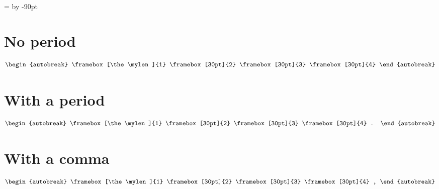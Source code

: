 \documentclass{article}
\begin{document}
\newdimen\mylen
\mylen=\linewidth
\advance\mylen by -90pt

\def\len{\the\mylen}

\section{No period}

\begin{align}
  \begin{autobreak}
    \framebox[\len]{1}
    \framebox[30pt]{2}
    \framebox[30pt]{3}
    \framebox[30pt]{4}
  \end{autobreak}
\end{align}

\section{With a period}

\begin{align}
  \begin{autobreak}
    \framebox[\len]{1}
    \framebox[30pt]{2}
    \framebox[30pt]{3}
    \framebox[30pt]{4}
    .
  \end{autobreak}
\end{align}

\section{With a comma}

\begin{align}
  \begin{autobreak}
    \framebox[\len]{1}
    \framebox[30pt]{2}
    \framebox[30pt]{3}
    \framebox[30pt]{4}
    ,
  \end{autobreak}
\end{align}
\end{document}

